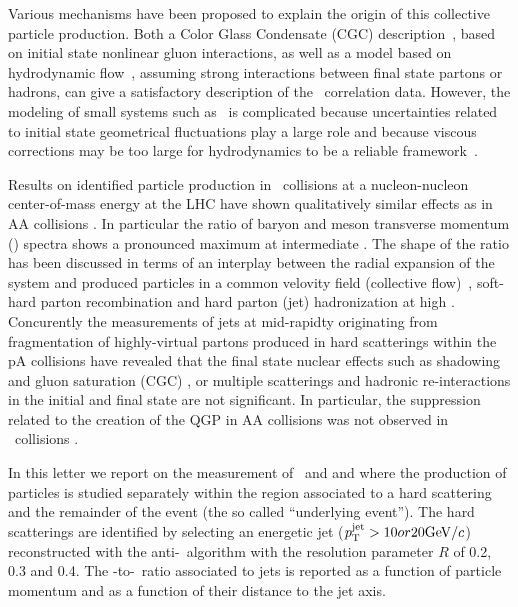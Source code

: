 Various mechanisms have been proposed to explain the origin of this collective particle production. 
Both a Color Glass Condensate (CGC) description~\cite{Dusling:2013oia}, based on initial state nonlinear gluon interactions, as well as a model based on hydrodynamic flow~\cite{Bozek:2012gr,Qin:2013bha}, assuming strong interactions between final state partons or hadrons, can give a satisfactory description of the \pPb\ correlation data. 
However, the modeling of small systems such as \pPb\ is complicated because uncertainties related to initial state geometrical fluctuations play a large role and because viscous corrections may be too large for hydrodynamics to be a reliable framework~\cite{Bzdak:2013zma}.

Results on identified particle production in \pPb\ collisions at a nucleon-nucleon center-of-mass energy  at the LHC \cite{Abelev:2013haa} have shown qualitatively similar effects as in AA collisions \cite{Abelev:2013xaa,ABELEV:2013wsa}. In particular the ratio of baryon and meson transverse momentum (\pt) spectra shows a pronounced maximum at intermediate \pt. The shape of the ratio has been discussed in terms of an interplay between the radial expansion of the system and produced particles in a common velovity field (collective flow)~\cite{Schnedermann:1993ws}, soft-hard parton recombination \cite{Fries:2003vb} and hard parton (jet) hadronization at high \pT. Concurently the measurements of jets at mid-rapidty originating from fragmentation of highly-virtual partons produced in hard scatterings within the pA collisions \cite{Adam:2015hoa,Adam:2015xea} have revealed that the final state nuclear effects such as shadowing and gluon saturation (CGC) \cite{McLerran:2001sr,Salgado:2011wc}, or multiple scatterings and hadronic re-interactions in the initial and final state \cite{Krzywicki:1979gv,Accardi:2007in} are not significant. In particular, the suppression related to the creation of the QGP in AA collisions was not observed in \pPb\ collisions \cite{Aad:2010bu,Chatrchyan:2012nia,Aad:2012vca,Abelev:2013kqa,Aad:2014bxa}.

In this letter we report on the measurement of \lda\ and \alda and \ks where the production of particles is studied separately within the region associated to a hard scattering and the remainder of the event (the so called ``underlying event''). The hard scatterings are identified by selecting an energetic jet ($p_{\mathrm{T}}^{\mathrm{jet}} > 10 or 20 \mathrm{GeV}/c$) reconstructed with the anti-\kt\ algorithm with the resolution parameter $R$ of 0.2, 0.3 and 0.4. The \lda-to-\ks\ ratio associated to jets is reported as a function of particle momentum and as a function of their distance to the jet axis.


